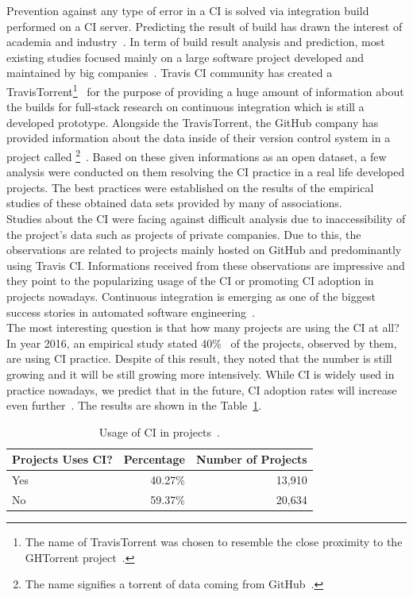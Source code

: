 Prevention against any type of error in a CI is solved via integration build performed on a CI server. Predicting the result of build has drawn the interest of academia and industry~\cite{ResultsOfCIbuild}. In term of build result analysis and prediction, most existing studies focused mainly on a large software project developed and maintained by big companies~\cite{ResultsOfCIbuild}. Travis CI community has created a TravisTorrent\footnote{The name of TravisTorrent was chosen to resemble the close proximity to the GHTorrent project~\cite{TravisTorrentWEBPAGE}.}~\cite{TravisTorrent} for the purpose of providing a huge amount of information about the builds for full-stack research on continuous integration which is still a developed prototype. Alongside the TravisTorrent, the GitHub company has provided information about the data inside of their version control system in a project called \footnote{The name signifies a torrent of data coming from GitHub~\cite{GHTorrentWEBPAGE}.}~\cite{GHTorrent}. Based on these given informations as an open dataset, a few analysis were conducted on them resolving the CI practice in a real life developed projects. The best practices were established on the results of the empirical studies of these obtained data sets provided by many of associations.\\

Studies about the CI were facing against difficult analysis due to inaccessibility of the project's data such as projects of private companies. Due to this, the observations are related to projects mainly hosted on GitHub and predominantly using Travis CI. Informations received from these observations are impressive and they point to the popularizing usage of the CI or promoting CI adoption in projects nowadays. Continuous integration is emerging as one of the biggest success stories in automated software engineering~\cite{COPE}.\\

The most interesting question is that how many projects are using the CI at all? In year 2016, an empirical study stated 40\%~\cite{COPE} of the projects, observed by them, are using CI practice. Despite of this result, they noted that the number is still growing and it will be still growing more intensively. While CI is widely used in practice nowadays, we predict that in the future, CI adoption rates will increase even further~\cite{COPE}. The results are shown in the Table~\ref{table:CI_usage}.

\begin{table}[H]
    \centering
    \begin{tabular}{|l|r|r|}
        \hline
        Projects Uses CI? & Percentage & Number of Projects \\
        \hline
        Yes               & 40.27\%    & 13,910             \\
        No                & 59.37\%    & 20,634             \\
        \hline
    \end{tabular}
    \caption{Usage of CI in projects~\cite{COPE}.}
    \label{table:CI_usage}
\end{table}


